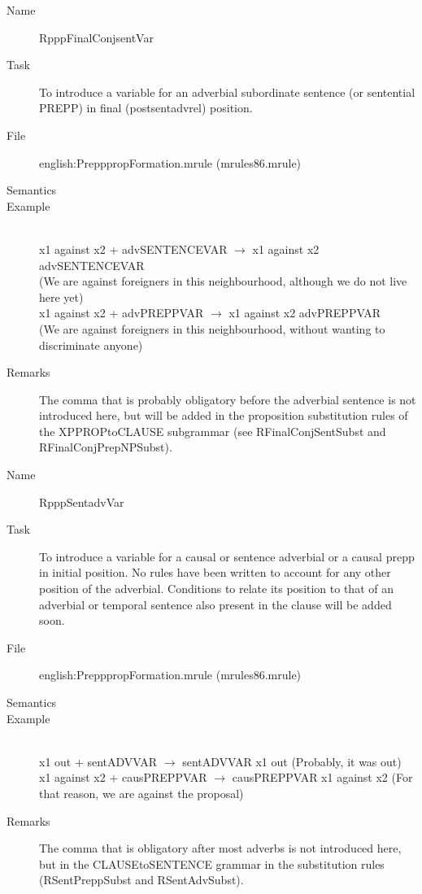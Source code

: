 \begin{description}
\vspace{1 cm}
\begin{description}
\item[Name] RpppFinalConjsentVar
\item[Task] To introduce a variable for an adverbial subordinate sentence (or 
sentential PREPP) in final (postsentadvrel) position.
\item[File] english:PrepppropFormation.mrule (mrules86.mrule)
\item[Semantics]
\item[Example] \mbox{}\\
x1 against x2 + advSENTENCEVAR $\rightarrow$ x1 against x2 advSENTENCEVAR \\
(We are against foreigners in this neighbourhood, although we do not live here 
yet)\\
x1 against x2 + advPREPPVAR $\rightarrow$ x1 against x2 advPREPPVAR \\
(We are against foreigners in this neighbourhood, without wanting to 
discriminate anyone)
\item[Remarks] The comma that is probably obligatory before the adverbial 
sentence is not introduced here, but will be added in the proposition 
substitution rules of the XPPROPtoCLAUSE subgrammar (see RFinalConjSentSubst and 
RFinalConjPrepNPSubst).
\end{description}

\vspace{1 cm}
\begin{description}
\item[Name] RpppSentadvVar
\item[Task] To introduce a variable for a causal or sentence adverbial or a 
causal prepp in 
initial position. No rules have been written to account for any other position 
of the adverbial. Conditions to relate its position to that of an adverbial or 
temporal sentence also present in the clause will be added soon.
\item[File] english:PrepppropFormation.mrule (mrules86.mrule)
\item[Semantics]
\item[Example] \mbox{}\\
x1 out + sentADVVAR $\rightarrow$ sentADVVAR x1 out (Probably, it was out)\\
x1 against x2 + causPREPPVAR $\rightarrow$ causPREPPVAR x1 against x2 (For that 
reason, we are against the proposal)
\item[Remarks] The comma that is obligatory after most adverbs is not introduced 
here, but in the CLAUSEtoSENTENCE grammar in the substitution rules 
(RSentPreppSubst and RSentAdvSubst).
\end{description}

\end{description}

